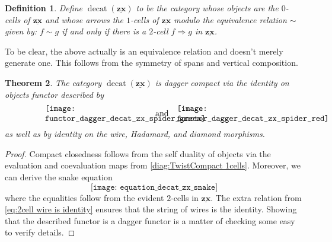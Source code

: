 \documentclass[]{amsart}
\newtheorem{thm}{Theorem}[section]
\theoremstyle{defn}
\newtheorem{defn}[thm]{Definition}
\begin{document}
\begin{defn}
	\label{def:decat zx}
	Define $\operatorname{decat}(\underline{\mathbf{zx}})$ to be the category whose objects are the $0$-cells of $\underline{\mathbf{zx}}$ and whose arrows the $1$-cells of $\underline{\mathbf{zx}}$ modulo the equivalence relation $\sim$ given by: $f \sim g$ if and only if there is a $2$-cell $f \Rightarrow g$ in $\underline{\mathbf{zx}}$.
\end{defn}

To be clear, the above actually is an equivalence relation and doesn't merely generate one.  This follows from the symmetry of spans and vertical composition.   

\begin{thm}
	\label{thm:decat zx is dagger compact}
	The category $\operatorname{decat}(\underline{\mathbf{zx}})$ is dagger compact via the identity on objects functor described by 
	\[
		\begin{minipage}{0.3\textwidth}
			\texttt{[image: functor\_dagger\_decat\_zx\_spider\_green]}
		\end{minipage}
		\quad \quad \quad \text{and} \quad
		\begin{minipage}{0.3\textwidth}
			\texttt{[image: functor\_dagger\_decat\_zx\_spider\_red]}
		\end{minipage}
	\]
	as well as by identity on the wire, Hadamard, and diamond morphisms.
\end{thm}
\begin{proof}
	Compact closedness follows from the self duality of objects via the evaluation and coevaluation maps from \eqref{diag:TwistCompact 1cells}. Moreover, we can derive the snake equation
	\[
	\texttt{[image: equation\_decat\_zx\_snake]}
	\]
	where the equalities follow from the evident $2$-cells in $\underline{\mathbf{zx}}$. The extra relation from \eqref{eq:2cell wire is identity} ensures that the string of wires is the identity.  Showing that the described functor is a dagger functor is a matter of checking some easy to verify details. 
\end{proof}
\end{document}
